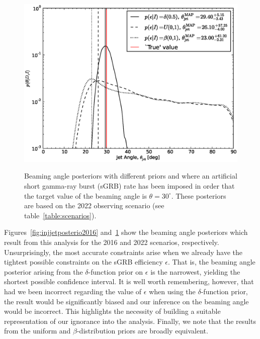 \documentclass[twocolumn,nofootinbib]{revtex4-1}
\def\sgrb#1{short gamma-ray burst#1 (sGRB#1)\gdef\sgrb{sGRB}}
\begin{document}
\begin{figure}%
\centering
{\includegraphics[width=\linewidth]{jet_angle_posterior_aligo_2022.eps}}
\caption{Beaming angle posteriors with different priors and where an artificial \sgrb{}
    rate has been imposed in order that the target value of the beaming angle is
$\theta = 30^{\circ}$.  These posteriors are based on the 2022 observing
scenario (see table~\ref{table:scenarios}). \label{fig:injjetposterio2022}}
\end{figure}
%
Figures~\ref{fig:injjetposterio2016} and~\ref{fig:injjetposterio2022} show the
beaming angle posteriors which result from this analysis for the 2016 and 2022
scenarios, respectively.  Unsurprisingly, the most accurate constraints arise
when we already have the tightest possible constraints on the \sgrb{} efficiency
$\epsilon$.  That is, the beaming angle posterior arising from the
$\delta$-function prior on $\epsilon$ is the narrowest, yielding the shortest
possible confidence interval.  It is well worth remembering, however, that had
we been incorrect regarding the value of $\epsilon$ when using the
$\delta$-function prior, the result would be significantly biased and our
inference on the beaming angle would be incorrect.  This highlights the
necessity of building a suitable representation of our ignorance into the
analysis.  Finally, we note that the results from the uniform and
$\beta$-distribution priors are broadly equivalent.
\end{document}
